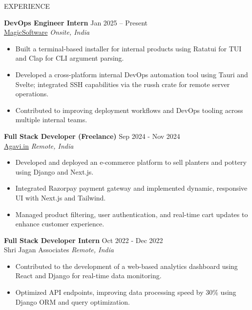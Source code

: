 \documentclass{resume} %
\begin{document}
\begin{rSection}{EXPERIENCE}

\textbf{DevOps Engineer Intern} \hfill Jan 2025 -- Present\\
\href{https://www.magicsoftware.com}{MagicSoftware} \hfill \textit{Onsite, India}
\begin{itemize}
    \itemsep -3pt {}
    \item Built a terminal-based installer for internal products using Ratatui for TUI and Clap for CLI argument parsing.
    \item Developed a cross-platform internal DevOps automation tool using Tauri and Svelte; integrated SSH capabilities via the russh crate for remote server operations.
    \item Contributed to improving deployment workflows and DevOps tooling across multiple internal teams.
\end{itemize} 

\textbf{Full Stack Developer (Freelance)} \hfill Sep 2024 - Nov 2024\\
\href{https://agavi.in}{Agavi.in} \hfill \textit{Remote, India}
 \begin{itemize}
    \itemsep -3pt {} 
     \item Developed and deployed an e-commerce platform to sell planters and pottery using Django and Next.js.
     \item Integrated Razorpay payment gateway and implemented dynamic, responsive UI with Next.js and Tailwind.
     \item Managed product filtering, user authentication, and real-time cart updates to enhance customer experience.
 \end{itemize}
 
\textbf{Full Stack Developer Intern} \hfill Oct 2022 - Dec 2022\\
Shri Jagan Associates \hfill \textit{Remote, India}
 \begin{itemize}
    \itemsep -3pt {} 
     \item Contributed to the development of a web-based analytics dashboard using React and Django for real-time data monitoring.
     \item Optimized API endpoints, improving data processing speed by 30\% using Django ORM and query optimization.
 \end{itemize}
\end{rSection} 

\end{document}
